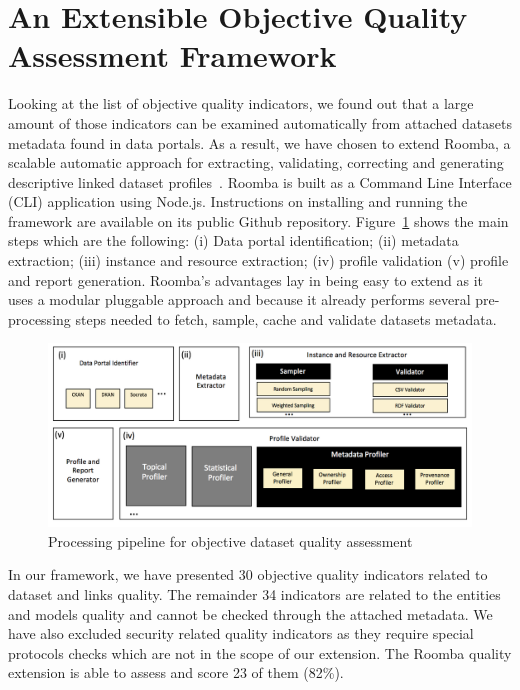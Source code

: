 \documentclass[onecolumn, crcready]{../../Tools/LaTEX/iosart2c}
\begin{document}

\section{An Extensible Objective Quality Assessment Framework}
\label{sec:quality-assessment-framework}

Looking at the list of objective quality indicators, we found out that a large amount of those indicators can be examined automatically from attached datasets metadata found in data portals. As a result, we have chosen to extend Roomba, a scalable automatic approach for extracting, validating, correcting and generating descriptive linked dataset profiles~\cite{Assaf:ESWC:PROFILES:15}. Roomba is built as a Command Line Interface (CLI) application using Node.js. Instructions on installing and running the framework are available on its public Github repository. Figure~\ref{fig:Roomba_architecture} shows the main steps which are the following: (i) Data portal identification; (ii) metadata extraction; (iii) instance and resource extraction; (iv) profile validation (v) profile and report generation. Roomba's advantages lay in being easy to extend as it uses a modular pluggable approach and because it already performs several pre-processing steps needed to fetch, sample, cache and validate datasets metadata.

\begin{figure}[!ht]
  \centering
    \includegraphics[scale=0.5]{figure-1_architecture.png}
  \caption{Processing pipeline for objective dataset quality assessment}
  \label{fig:Roomba_architecture}
\end{figure}

In our framework, we have presented 30 objective quality indicators related to dataset and links quality. The remainder 34 indicators are related to the entities and models quality and cannot be checked through the attached metadata. We have also excluded security related quality indicators as they require special protocols checks which are not in the scope of our extension. The Roomba quality extension is able to assess and score 23 of them (82\%).
\end{document}
